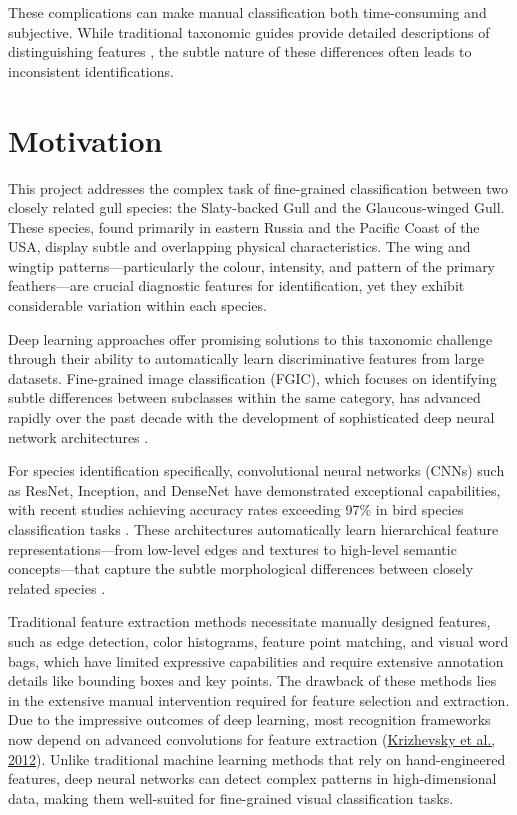 These complications can make manual classification both time-consuming and subjective. While traditional taxonomic guides provide detailed descriptions of distinguishing features , the subtle nature of these differences often leads to inconsistent identifications.


\section*{Motivation}

This project addresses the complex task of fine-grained classification between two closely related gull species: the Slaty-backed Gull and the Glaucous-winged Gull. These species, found primarily in eastern Russia and the Pacific Coast of the USA, display subtle and overlapping physical characteristics. The wing and wingtip patterns—particularly the colour, intensity, and pattern of the primary feathers—are crucial diagnostic features for identification, yet they exhibit considerable variation within each species.

Deep learning approaches offer promising solutions to this taxonomic challenge through their ability to automatically learn discriminative features from large datasets. Fine-grained image classification (FGIC), which focuses on identifying subtle differences between subclasses within the same category, has advanced rapidly over the past decade with the development of sophisticated deep neural network architectures \citet{karpathy2015}.

For species identification specifically, convolutional neural networks (CNNs) such as ResNet, Inception, and DenseNet have demonstrated exceptional capabilities, with recent studies achieving accuracy rates exceeding 97\% in bird species classification tasks \citep{he2016}. These architectures automatically learn hierarchical feature representations—from low-level edges and textures to high-level semantic concepts—that capture the subtle morphological differences between closely related species \citep{simonyan2014}.


Traditional feature extraction methods necessitate manually designed features, such as edge detection, color histograms, feature point matching, and visual word bags, which have limited expressive capabilities and require extensive annotation details like bounding boxes and key points. The drawback of these methods lies in the extensive manual intervention required for feature selection and extraction. Due to the impressive outcomes of deep learning, most recognition frameworks now depend on advanced convolutions for feature extraction (\href{https://www.frontiersin.org/journals/neurorobotics/articles/10.3389/fnbot.2024.1391791/full#ref10}{Krizhevsky et al., 2012}).
Unlike traditional machine learning methods that rely on hand-engineered features, deep neural networks can detect complex patterns in high-dimensional data, making them well-suited for fine-grained visual classification tasks.

